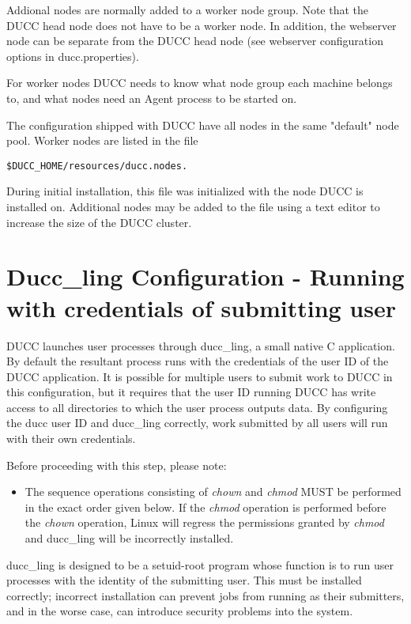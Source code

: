    Addional nodes are normally added to a worker node group. Note that the
   DUCC head node does not have to be a worker node.
   In addition, the webserver node can be separate from the DUCC head node 
   (see webserver configuration options in ducc.properties).

   For worker nodes DUCC needs to know what node group
   each machine belongs to, and what nodes need an Agent process to be started on.

   The configuration shipped with DUCC have all nodes in the same "default" node pool.
   Worker nodes are listed in the file
\begin{verbatim}
$DUCC_HOME/resources/ducc.nodes.  
\end{verbatim}
   
   During initial installation, this file was initialized with the node DUCC is installed on.
   Additional nodes may be added to the file using a text editor to increase the size of the DUCC
   cluster.


\section{Ducc\_ling Configuration - Running with credentials of submitting user}
\label{sec:duccling.install}

   DUCC launches user processes through ducc\_ling, a small native C application.
   By default the resultant process runs with the credentials of the user ID of
   the DUCC application. It is possible for multiple users to submit work to
   DUCC in this configuration, but it requires that the user ID running DUCC has
   write access to all directories to which the user process outputs data.
   By configuring the ducc user ID and ducc\_ling correctly, work submitted by
   all users will run with their own credentials.  

    Before proceeding with this step, please note: 
    \begin{itemize}
        \item The sequence operations consisting of {\em chown} and {\em chmod} MUST be performed
          in the exact order given below.  If the {\em chmod} operation is performed before
          the {\em chown} operation, Linux will regress the permissions granted by {\em chmod} 
          and ducc\_ling will be incorrectly installed.
    \end{itemize}

    ducc\_ling is designed to be a setuid-root program whose function is to run user processes with the identity of
    the submitting user. This must be installed correctly; incorrect installation can prevent jobs from running as
    their submitters, and in the worse case, can introduce security problems into the system.

